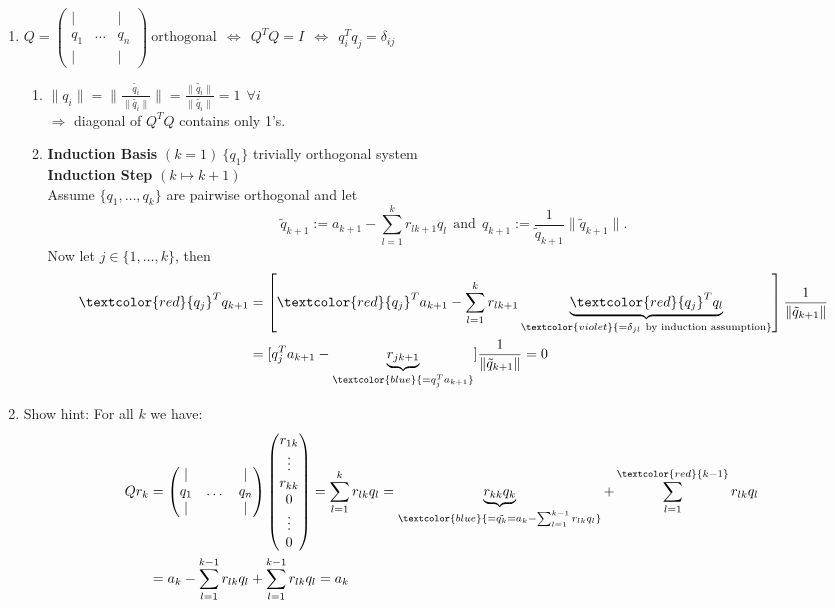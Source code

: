 {\color{solution}
\begin{enumerate}
	\item $Q=\begin{pmatrix}|& &|\\q_1&\dots&q_n\\|& &|\end{pmatrix}~
	\text{orthogonal}~~\Leftrightarrow~~Q^TQ=I~~\Leftrightarrow~~q_i^Tq_j=\delta_{ij}$
	\begin{enumerate}
		\item $\|q_i\|=\lVert\frac{\tilde{q_i}}{\|\tilde{q_i}\|}\rVert=\frac{\|\tilde{q_i}\|}{\|\tilde{q_i}\|}=1~~\forall i$\\
		$\Rightarrow$ diagonal of $Q^TQ$ contains only 1's.
		\item 
		\textbf{Induction Basis} $(k=1)~\{q_1\}$ trivially orthogonal system\\
		\textbf{Induction Step} $(k \mapsto k+1)$\\
		Assume $\{q_1,\dots,q_k\}$ are pairwise orthogonal and let
		$$
		\tilde{q}_{k+1}:=a_{k+1}-\sum_{l=1}^{k}r_{lk+1}q_l~~\text{and}~~q_{k+1}:=\frac{1}{\tilde{q}_{k+1}}{\|\tilde{q}_{k+1}\|}.
		$$ 
		Now let $j\in\{1,\dots,k\}$, then
		\begin{align*}
		\textcolor{red}{q_j}^Tq_{k+1}&=\left[\textcolor{red}{q_j}^Ta_{k+1}-\sum_{l=1}^{k}r_{lk+1}\underbrace{\textcolor{red}{q_j}^Tq_l}_{\textcolor{violet}{=\delta_{jl}~\text{by induction assumption}}}\right]\frac{1}{\|\tilde{q}_{k+1}\|}\\
		&=[q_j^Ta_{k+1}-\underbrace{r_{jk+1}}_{\textcolor{blue}{=q_j^Ta_{k+1}}}]\frac{1}{\|\tilde{q}_{k+1}\|}=0
		\end{align*}
	\end{enumerate}
	\item Show hint: For all $k$ we have:
	\begin{align*}
	Qr_k&=\begin{pmatrix}|& &|\\q_1&\dots&q_n\\|& &|\end{pmatrix}\begin{pmatrix}r_{1k}\\\vdots\\r_{kk}\\0\\\vdots\\0\end{pmatrix}=\sum_{l=1}^{k}r_{lk}q_l=\underbrace{r_{kk}q_k}_{\textcolor{blue}{=\tilde{q_k}=a_k-\sum_{l=1}^{k-1}r_{lk}q_l}}+\sum_{l=1}^{\textcolor{red}{k-1}}r_{lk}q_l\\
	&=a_k-\sum_{l=1}^{k-1}r_{lk}q_l+\sum_{l=1}^{k-1}r_{lk}q_l=a_k
	\end{align*}
\end{enumerate}
}